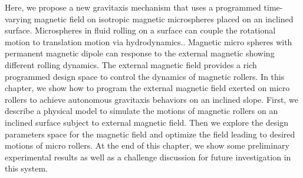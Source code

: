 Here, we propose a new gravitaxis mechanism that uses a programmed time-varying magnetic field on isotropic magnetic microspheres placed on an inclined surface. Microspheres in fluid rolling on a surface can couple the rotational motion to translation motion via hydrodynamics.\cite{galvin2001time,rashidi2016theoretical}. Magnetic micro spheres with permanent magnetic dipole  can response to the external  magnetic showing different rolling dynamics. \cite{helgesen2019propulsion,helgesen2018magnetic}
The external magnetic field provides a rich programmed design space to control the dynamics of magnetic rollers.
In this chapter, we show how to program the external magnetic field exerted on  micro rollers to achieve autonomous gravitaxis behaviors on an inclined slope. First, we describe a physical model to simulate the motions of magnetic rollers on an inclined surface subject to external magnetic field. Then we explore the design parameters space for the magnetic field  and optimize the field leading to desired motions of  micro rollers. At the end of this chapter, we show some preliminary experimental results as well as a challenge discussion for future investigation in this system. 

